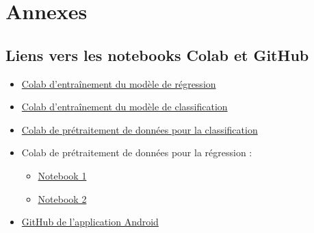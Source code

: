 \appendix
\chapter*{Annexes}

\section{Liens vers les notebooks Colab et GitHub}

\begin{itemize}
  \item \href{https://colab.research.google.com/drive/1WhaF2jE4ruWc6pByavec3E4Q6ijtsSvc?usp=sharing}{Colab d'entraînement du modèle de régression}

  \item \href{https://colab.research.google.com/drive/1iKeuTVjw6RtWP935TcWio7b9p6vjdsI0?usp=sharing}{Colab d'entraînement du modèle de classification}

  \item \href{https://colab.research.google.com/drive/1MJzRelOdtMpLDED62YKCTAENZ-j5BKGF?usp=sharing}{Colab de prétraitement de données pour la classification}

  \item Colab de prétraitement de données pour la régression : 
  \begin{itemize}
    \item \href{https://colab.research.google.com/drive/1aUlAik45c6v8C0GXGo_OrgLEPCQ-7mMI?usp=sharing}{Notebook 1}
    \item \href{https://colab.research.google.com/drive/1Xe0IfXKSYyPatz7qS6MPJhF55g3mx633?usp=sharing}{Notebook 2}
  \end{itemize}

  \item \href{https://github.com/Thisi47/bean_cooking_time_predictor.git}{GitHub de l'application Android}
\end{itemize}
